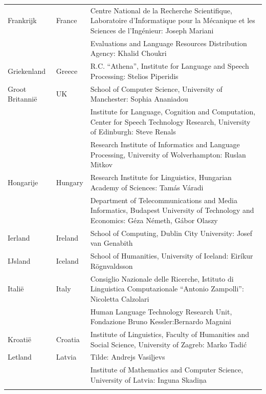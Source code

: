 \begin{longtable}{@{}llp{113mm}@{}}
  Frankrijk & \textcolor{grey1}{France} & Centre National de la Recherche Scientifique, Laboratoire d'Informatique pour la Mécanique et les Sciences de l'Ingénieur: Joseph Mariani \\ \addlinespace
  & & Evaluations and Language Resources Distribution Agency: Khalid Choukri\\ \addlinespace
  Griekenland & \textcolor{grey1}{Greece} & R.C. “Athena”, Institute for Language and Speech Processing: Stelios Piperidis\\ \addlinespace
  Groot Britanni{\"e} & \textcolor{grey1}{UK} &
  School of Computer Science, University of Manchester: Sophia Ananiadou \\ \addlinespace
  & & Institute for Language, Cognition and Computation, Center for Speech Technology Research, University of Edinburgh: Steve Renals \\ \addlinespace
  & & Research Institute of Informatics and Language Processing, University of Wolverhampton: Ruslan Mitkov \\ \addlinespace
   Hongarije & \textcolor{grey1}{Hungary} & Research Institute for Linguistics, Hungarian Academy of Sciences: Tamás Váradi\\  \addlinespace
  & & Department of Telecommunications and Media Informatics, Budapest University of Technology and Economics: Géza Németh, Gábor Olaszy\\ \addlinespace
  Ierland & \textcolor{grey1}{Ireland} & School of Computing, Dublin City University: Josef van Genabith\\ \addlinespace
  IJsland & \textcolor{grey1}{Iceland} & School of Humanities, University of Iceland: Eiríkur Rögnvaldsson\\ \addlinespace
  Itali{\"e} & \textcolor{grey1}{Italy} & Consiglio Nazionale delle Ricerche, Istituto di Linguistica Computazionale “Antonio Zampolli”: Nicoletta Calzolari\\ \addlinespace
  & & Human Language Technology Research Unit, Fondazione Bruno Kessler:\newline Bernardo Magnini\\ \addlinespace
  Kroati{\"e} & \textcolor{grey1}{Croatia} & Institute of Linguistics, Faculty of Humanities and Social Science, University of Zagreb: Marko Tadić \\ \addlinespace
  Letland & \textcolor{grey1}{Latvia} & Tilde: Andrejs Vasiļjevs\\ \addlinespace
  & & Institute of Mathematics and Computer Science, University of Latvia: Inguna Skadiņa\\ \addlinespace

\end{longtable}
